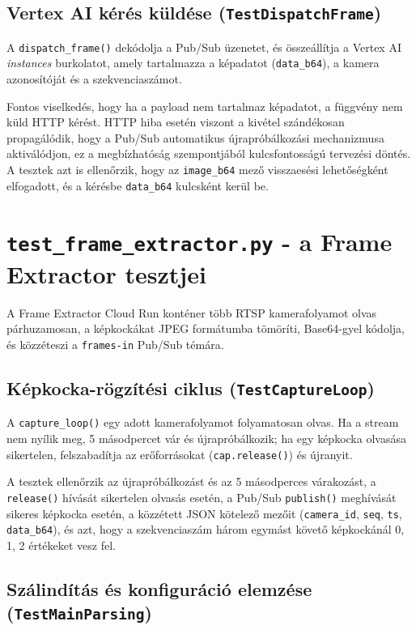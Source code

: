\documentclass[12pt,a4paper]{article}
\begin{document}
\subsection{Vertex AI kérés küldése (\texttt{TestDispatchFrame})}

A \texttt{dispatch\_frame()} dekódolja a Pub/Sub üzenetet, és összeállítja a
Vertex AI \textit{instances} burkolatot, amely tartalmazza a képadatot
(\texttt{data\_b64}), a kamera azonosítóját és a szekvenciaszámot.

Fontos viselkedés, hogy ha a payload nem tartalmaz képadatot, a függvény
nem küld HTTP kérést. HTTP hiba esetén viszont a kivétel szándékosan
propagálódik, hogy a Pub/Sub automatikus újrapróbálkozási mechanizmusa
aktiválódjon, ez a megbízhatóság szempontjából kulcsfontosságú tervezési döntés.
A tesztek azt is ellenőrzik, hogy az \texttt{image\_b64} mező visszaesési lehetőségként
elfogadott, és a kérésbe \texttt{data\_b64} kulcsként kerül be.

\section{\texttt{test\_frame\_extractor.py} - a Frame Extractor tesztjei}

A Frame Extractor Cloud Run konténer több RTSP kamerafolyamot olvas párhuzamosan,
a képkockákat JPEG formátumba tömöríti, Base64-gyel kódolja, és közzéteszi a
\texttt{frames-in} Pub/Sub témára.

\subsection{Képkocka-rögzítési ciklus (\texttt{TestCaptureLoop})}

A \texttt{capture\_loop()} egy adott kamerafolyamot folyamatosan olvas. Ha a stream
nem nyílik meg, 5 másodpercet vár és újrapróbálkozik; ha egy képkocka olvasása
sikertelen, felszabadítja az erőforrásokat (\texttt{cap.release()}) és újranyit.

A tesztek ellenőrzik az újrapróbálkozást és az 5 másodperces várakozást, a
\texttt{release()} hívását sikertelen olvasás esetén, a Pub/Sub \texttt{publish()}
meghívását sikeres képkocka esetén, a közzétett JSON kötelező mezőit
(\texttt{camera\_id}, \texttt{seq}, \texttt{ts}, \texttt{data\_b64}), és azt,
hogy a szekvenciaszám három egymást követő képkockánál 0, 1, 2 értékeket vesz fel.

\subsection{Szálindítás és konfiguráció elemzése (\texttt{TestMainParsing})}
\end{document}
